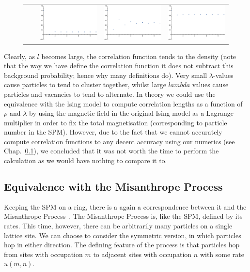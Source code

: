 \begin{figure}[h!]
\begin{center}
\begin{tabular}{c  c | c | c | c}
    \hline
    \raisebox{3 em}{ $10$ } & &    \includegraphics[width=0.25\linewidth]{analytics/images/exactCorrFns/lowDensHighL}  & \includegraphics[width=0.25 \linewidth]{analytics/images/exactCorrFns/midDensHighL} & \includegraphics[width=0.25 \linewidth]{analytics/images/exactCorrFns/highDensHighL} \\
    \end{tabular}
\end{center}
    \vspace{-2em}
\end{figure}

Clearly, as $l$ becomes large, the correlation function tends to the density (note that the way we have define the correlation function it does not subtract this background probability; hence why many definitions do). Very small $\lambda$-values
cause particles to tend to cluster together, whilst large $lambda$ values cause particles and vacancies to tend to alternate. In theory we could use the equivalence with the Ising model to compute correlation lengths as a function
of $\rho$ and $\lambda$ by using the magnetic field in the original Ising model as a Lagrange multiplier in order to fix the total magnetisation (corresponding to particle number in the SPM). However, due to the fact that we cannot
accurately compute correlation functions to any decent accuracy using our numerics (see Chap.~\ref{}), we concluded that it was not worth the time to perform the calculation as we would have nothing to compare it to.

\subsection{Equivalence with the Misanthrope Process}

Keeping the SPM on a ring, there is a again a correspondence between it and the Misanthrope Process~\cite{evansWaclaw2014}. The Misanthrope Process is, like the SPM, defined by its rates. This time, however, there can be arbitrarily many particles
on a single lattice site. We can choose to consider the symmetric version, in which particles hop in either direction. The defining feature of the process is that particles hop from sites with occupation $m$ to adjacent sites with occupation
$n$ with some rate $u(m, n)$.

